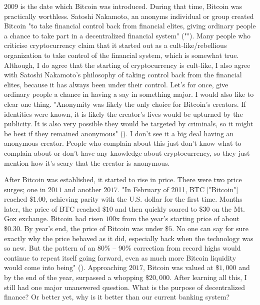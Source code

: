 \begin{essay}

  $2009$ is the date which Bitcoin was introduced. During that time, Bitcoin
  was practically worthless. Satoshi Nakamoto, an anonyms individual or group
  created Bitcoin "to take financial control back from financial elites, giving
  ordinary people a chance to take part in a decentralized financial system"
  ("\cite{noauthor_who_nodate}"). Many people who criticise cryptocurrency
  claim that it started out as a cult-like/rebellious organization to take
  control of the financial system, which is somewhat true. Although, I do agree
  that the starting of cryptocurrency is cult-like, I also agree with Satoshi
  Nakamoto's philosophy of taking control back from the financial elites,
  because it has always been under their control. Let's for once, give ordinary
  people a chance in having a say in something major. I would also like to
  clear one thing. "Anonymity was likely the only choice for Bitcoin's
  creators. If identities were known, it is likely the creator's lives would be
  upturned by the publicity. It is also very possible they would be targeted by
  criminals, so it might be best if they remained anonymous"
  (\cite{hayes_who_nodate}). I don't see it a big deal having an anonymous
  creator. People who complain about this just don't know what to complain
  about or don't have any knowledge about cryptocurrency, so they just mention
  how it's scary that the creator is anonymous.


  After Bitcoin was established, it started to rise in price. There were two
  price surges; one in $2011$ and another $2017$. "In February of 2011, BTC
  ["Bitcoin"] reached $\$1.00$, achieving parity with the U.S. dollar for the
  first time. Months later, the price of BTC reached $\$10$ and then quickly
  soared to $\$30$ on the Mt. Gox exchange. Bitcoin had risen $100$x from the
  year’s starting price of about $\$0.30$. By year’s end, the price of
  Bitcoin was under $\$5$. No one can say for sure exactly why the price
  behaved as it did, especially back when the technology was so new. But the
  pattern of an 80\% – 90\% correction from record highs would continue to
  repeat itself going forward, even as much more Bitcoin liquidity would come
  into being" (\cite{noauthor_bitcoin_2021}). Approaching $2017$, Bitcoin was
  valued at $\$1,000$ and by the end of the year, surpassed a whopping
  $\$20,000$. After learning all this, I still had one major unanswered
  question. What is the purpose of decentralized finance? Or better yet, why
  is it better than our current banking system?


\end{essay}
